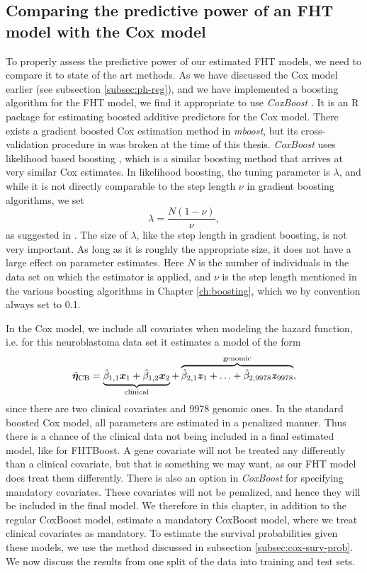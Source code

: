 \subsection{Comparing the predictive power of an FHT model with the Cox model}
To properly assess the predictive power of our estimated FHT models, we need to compare it to state of the art methods.
As we have discussed the Cox model earlier (see subsection \ref{subsec:ph-reg}), and we have implemented a boosting algorithm for the FHT model, we find it appropriate to use \textit{CoxBoost} \citep{coxboost}.
It is an R package for estimating boosted additive predictors for the Cox model.
There exists a gradient boosted Cox estimation method in \textit{mboost}, but its cross-validation procedure in was broken at the time of this thesis. 
\textit{CoxBoost} uses likelihood based boosting \citep{gamboost}, which is a similar boosting method that arrives at very similar Cox estimates.
In likelihood boosting, the tuning parameter is $\lambda$, and while it is not directly comparable to the step length $\nu$ in gradient boosting algorithms, we set
\begin{equation}\label{eq:lambda-nu}
    \lambda=\frac{N(1-\nu)}{\nu},
\end{equation}
as suggested in \citet{DeBin2016}.
The size of $\lambda$, like the step length in gradient boosting, is not very important.
As long as it is roughly the appropriate size, it does not have a large effect on parameter estimates.
Here $N$ is the number of individuals in the data set on which the estimator is applied, and $\nu$ is the step length mentioned in the various boosting algorithms in Chapter \ref{ch:boosting}, which we by convention always set to 0.1.

In the Cox model, we include all covariates when modeling the hazard function, i.e. for this neuroblastoma data set it estimates a model of the form
\begin{equation*}
    \hat{\boldsymbol{\eta}}_{\text{CB}}=\underbrace{\hat{\beta}_{1,1}\bm{x}_1+\hat{\beta}_{1,2}\bm{x}_{2}}_{\text{clinical}}+\overbrace{\hat{\beta}_{2,1}\bm{z}_1+\ldots+\hat{\beta}_{2,9978}\bm{z}_{9978}}^{\text{genomic}},
\end{equation*}
since there are two clinical covariates and 9978 genomic ones.
In the standard boosted Cox model, all parameters are estimated in a penalized manner.
Thus there is a chance of the clinical data not being included in a final estimated model, like for FHTBoost.
A gene covariate will not be treated any differently than a clinical covariate, but that is something we may want, as our FHT model does treat them differently.
There is also an option in \textit{CoxBoost} for specifying mandatory covariates.
These covariates will not be penalized, and hence they will be included in the final model.
We therefore in this chapter, in addition to the regular CoxBoost model, estimate a mandatory CoxBoost model, where we treat clinical covariates as mandatory.
To estimate the survival probabilities given these models, we use the method discussed in subsection \ref{subsec:cox-surv-prob}.
We now discuss the results from one split of the data into training and test sets.

